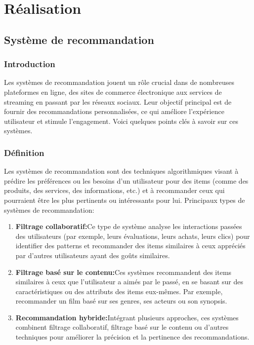 \documentclass[edit,12pt,a4paper,ChapStyle,oneside,doubleinterligne]{report}
\begin{document}
\clearpage 
\part{Réalisation}
\chapter{Système de recommandation}
\section{Introduction}
Les systèmes de recommandation jouent un rôle crucial dans de nombreuses plateformes en ligne, des sites de commerce électronique aux services de streaming en passant par les réseaux sociaux. Leur objectif principal est de fournir des recommandations personnalisées, ce qui améliore l'expérience utilisateur et stimule l'engagement. Voici quelques points clés à savoir sur ces systèmes.
\section{Définition}
Les systèmes de recommandation sont des techniques algorithmiques visant à prédire les préférences ou les besoins d'un utilisateur pour des items (comme des produits, des services, des informations, etc.) et à recommander ceux qui pourraient être les plus pertinents ou intéressants pour lui.
\newline Principaux types de systèmes de recommandation:
\begin{enumerate}
    \item \textbf{Filtrage collaboratif:}Ce type de système analyse les interactions passées des utilisateurs (par exemple, leurs évaluations, leurs achats, leurs clics) pour identifier des patterns et recommander des items similaires à ceux appréciés par d'autres utilisateurs ayant des goûts similaires.
    \item \textbf{Filtrage basé sur le contenu:}Ces systèmes recommandent des items similaires à ceux que l'utilisateur a aimés par le passé, en se basant sur des caractéristiques ou des attributs des items eux-mêmes. Par exemple, recommander un film basé sur ses genres, ses acteurs ou son synopsis.
    \item \textbf{Recommandation hybride:}Intégrant plusieurs approches, ces systèmes combinent filtrage collaboratif, filtrage basé sur le contenu ou d'autres techniques pour améliorer la précision et la pertinence des recommandations.
\end{enumerate}
\end{document}
